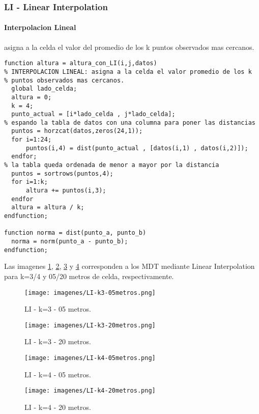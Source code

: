 \documentclass{article}
\begin{document}
\subsubsection{LI - Linear Interpolation}
\paragraph{Interpolacion Lineal} asigna a la celda el valor del promedio de los k
puntos observados mas cercanos.
\begin{verbatim}
function altura = altura_con_LI(i,j,datos)
% INTERPOLACION LINEAL: asigna a la celda el valor promedio de los k
% puntos observados mas cercanos.
  global lado_celda;
  altura = 0;
  k = 4;
  punto_actual = [i*lado_celda , j*lado_celda];
% espando la tabla de datos con una columna para poner las distancias
  puntos = horzcat(datos,zeros(24,1));
  for i=1:24;
      puntos(i,4) = dist(punto_actual , [datos(i,1) , datos(i,2)]);
  endfor;
% la tabla queda ordenada de menor a mayor por la distancia
  puntos = sortrows(puntos,4);
  for i=1:k;
      altura += puntos(i,3);
  endfor
  altura = altura / k;
endfunction;

function norma = dist(punto_a, punto_b)
  norma = norm(punto_a - punto_b);
endfunction;
\end{verbatim}

Las imagenes
\ref{fig:mdt-nnk305}, \ref{fig:mdt-nnk320}, \ref{fig:mdt-nnk405} y
\ref{fig:mdt-nnk420} corresponden a los MDT mediante Linear
Interpolation para k=3/4 y 05/20 metros de celda, respectivamente.

\begin{figure}[H]
  \centering
  \texttt{[image: imagenes/LI-k3-05metros.png]}
  \caption{LI - k=3 - 05 metros.}
  \label{fig:mdt-nnk305}
\end{figure}
\begin{figure}
  \centering
  \texttt{[image: imagenes/LI-k3-20metros.png]}
  \caption{LI - k=3 - 20 metros.}
  \label{fig:mdt-nnk320}
\end{figure}
\begin{figure}[H]
  \centering
  \texttt{[image: imagenes/LI-k4-05metros.png]}
  \caption{LI - k=4 - 05 metros.}
  \label{fig:mdt-nnk405}
\end{figure}
\begin{figure}
  \centering
  \texttt{[image: imagenes/LI-k4-20metros.png]}
  \caption{LI - k=4 - 20 metros.}
  \label{fig:mdt-nnk420}
\end{figure}
\end{document}
